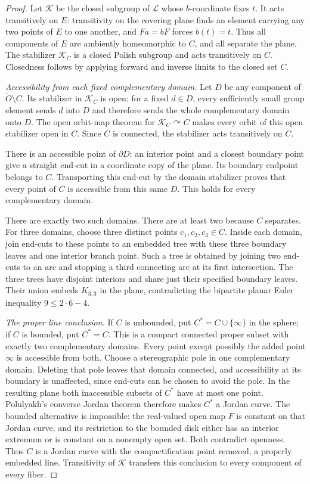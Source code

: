 \begin{proof}
Let $\mathcal K$ be the closed subgroup of
$\mathcal L$ whose $b$-coordinate fixes $t$.
It acts transitively on $E$: transitivity on the
covering plane finds an element carrying any
two points of $E$ to one another, and
$Fa=bF$ forces $b(t)=t$.
Thus all components of $E$ are ambiently
homeomorphic to $C$, and all separate the plane.
The stabilizer $\mathcal K_C$ is a closed Polish
subgroup and acts transitively on $C$.
Closedness follows by applying forward and inverse
limits to the closed set $C$.

\emph{Accessibility from each fixed complementary domain.}
Let $D$ be any component of
$\widetilde O\setminus C$.
Its stabilizer in $\mathcal K_C$ is open:
for a fixed $d\in D$, every sufficiently small
group element sends $d$ into $D$ and therefore
sends the whole complementary domain onto $D$.
The open orbit-map theorem for
$\mathcal K_C\curvearrowright C$ makes every
orbit of this open stabilizer open in $C$.
Since $C$ is connected, the stabilizer acts
transitively on $C$.

There is an accessible point of $\partial D$:
an interior point and a closest boundary point
give a straight end-cut in a coordinate copy of
the plane. Its boundary endpoint belongs to $C$.
Transporting this end-cut by the domain
stabilizer proves that every point of $C$
is accessible from this same $D$.
This holds for every complementary domain.

There are exactly two such domains.
There are at least two because $C$ separates.
For three domains, choose three distinct points
$c_1,c_2,c_3\in C$. Inside each domain, join
end-cuts to these points to an embedded tree
with these three boundary leaves and one
interior branch point. Such a tree is obtained
by joining two end-cuts to an arc and stopping
a third connecting arc at its first intersection.
The three trees have disjoint interiors and
share just their specified boundary leaves.
Their union embeds $K_{3,3}$ in the plane,
contradicting the bipartite planar Euler
inequality $9\leq2\cdot6-4$.

\emph{The proper line conclusion.}
If $C$ is unbounded, put
$C^*=C\cup\{\infty\}$ in the sphere; if $C$
is bounded, put $C^*=C$.
This is a compact connected proper subset
with exactly two complementary domains.
Every point except possibly the added
point $\infty$ is accessible from both.
Choose a stereographic pole in one complementary
domain. Deleting that pole leaves that domain
connected, and accessibility at its boundary
is unaffected, since end-cuts can be chosen
to avoid the pole. In the resulting plane
both inaccessible subsets of $C^*$ have
at most one point.
Polulyakh's converse Jordan theorem
\cite[Theorem 1.1 and Corollary 1.1]{C_Polulyakh2000}
therefore makes $C^*$ a Jordan curve.
The bounded alternative is impossible:
the real-valued open map $F$ is constant
on that Jordan curve, and its restriction
to the bounded disk either has an interior
extremum or is constant on a nonempty
open set. Both contradict openness.
Thus $C$ is a Jordan curve with the
compactification point removed, a properly
embedded line. Transitivity of $\mathcal K$
transfers this conclusion to every component
of every fiber.


\end{proof}
